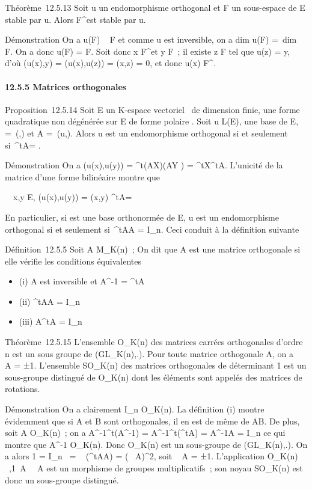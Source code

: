 \documentclass[]{article}
\begin{document}
Théorème~12.5.13 Soit u un endomorphisme orthogonal et F un sous-espace
de E stable par u. Alors F^\bot est stable par u.

Démonstration On a u(F) \subset~ F et comme u est inversible, on a
dim u(F) =\ dim~ F. On
a donc u(F) = F. Soit donc x \in F^\bot et y \in F~; il existe z \in F
tel que u(z) = y, d'où \phi(u(x),y) = \phi(u(x),u(z)) = \phi(x,z) = 0, et donc
u(x) \in F^\bot.

\paragraph{12.5.5 Matrices orthogonales}

Proposition~12.5.14 Soit E un K-espace vectoriel ~de dimension finie, \Phi
une forme quadratique non dégénérée sur E de forme polaire \phi. Soit u \in
L(E),  une base de E, \Omega =\
\mathrmMat (\phi,) et A =\
\mathrmMat (u,). Alors u est un endomorphisme
orthogonal si et seulement si~^tA\OmegaA = \Omega.

Démonstration On a \phi(u(x),u(y)) = ^t(AX)\Omega(AY ) =
^tX^tA\OmegaAY . L'unicité de la matrice d'une forme
bilinéaire montre que

\forall~~x,y \in E, \phi(u(x),u(y)) = \phi(x,y)
\Leftrightarrow ^tA\OmegaA = \Omega

En particulier, si  est une base orthonormée de E, u est un
endomorphisme orthogonal si et seulement si~^tAA =
I\_n. Ceci conduit à la définition suivante

Définition~12.5.5 Soit A \in M\_K(n)~; On dit que A est une
matrice orthogonale si elle vérifie les conditions équivalentes

\begin{itemize}
\itemsep1pt\parskip0pt
\item
  (i) A est inversible et A^-1 = ^tA
\item
  (ii) ^tAA = I\_n
\item
  (iii) A^tA = I\_n
\end{itemize}

Théorème~12.5.15 L'ensemble O\_K(n) des matrices carrées
orthogonales d'ordre n est un sous groupe de (GL\_K(n),.). Pour
toute matrice orthogonale A, on a
\mathrm{det}~ A = ±1.
L'ensemble SO\_K(n) des matrices orthogonales de déterminant 1
est un sous-groupe distingué de O\_K(n) dont les éléments sont
appelés des matrices de rotations.

Démonstration On a clairement I\_n \in O\_K(n). La
définition (i) montre évidemment que si A et B sont orthogonales, il en
est de même de AB. De plus, soit A \in O\_K(n)~; on a
A^-1^t(A^-1) =
A^-1^t(^tA) = A^-1A =
I\_n ce qui montre que A^-1 \in O\_K(n). Donc
O\_K(n) est un sous-groupe de (GL\_K(n),.). On a alors 1
=  I\_n~
= ~
(^tAA) =
(~
A)^2, soit
~ A = ±1.
L'application O\_K(n) \rightarrow~,1\,
A\mapsto~\mathrm{det}~
A est un morphisme de groupes multiplicatifs~; son noyau
SO\_K(n) est donc un sous-groupe distingué.
\end{document}
